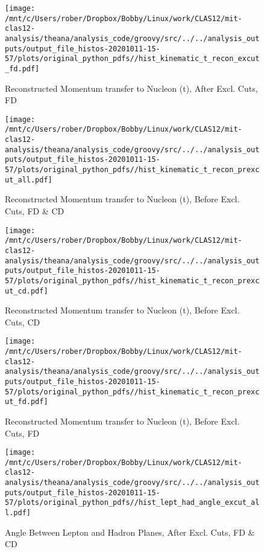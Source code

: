 \documentclass{article}
\begin{document}
\begin{landscape}
\begin{figure}[h]
        \texttt{[image: /mnt/c/Users/rober/Dropbox/Bobby/Linux/work/CLAS12/mit-clas12-analysis/theana/analysis\_code/groovy/src/../../analysis\_outputs/output\_file\_histos-20201011-15-57/plots/original\_python\_pdfs//hist\_kinematic\_t\_recon\_excut\_fd.pdf]}
        \captionsetup{textformat=empty,labelformat=blank}
        \caption{Reconstructed Momentum transfer to Nucleon (t), After Excl. Cuts, FD}
    \end{figure}
    \clearpage
    
    \begin{figure}[h]
        \centering

        \texttt{[image: /mnt/c/Users/rober/Dropbox/Bobby/Linux/work/CLAS12/mit-clas12-analysis/theana/analysis\_code/groovy/src/../../analysis\_outputs/output\_file\_histos-20201011-15-57/plots/original\_python\_pdfs//hist\_kinematic\_t\_recon\_prexcut\_all.pdf]}
        \captionsetup{textformat=empty,labelformat=blank}
        \caption{Reconstructed Momentum transfer to Nucleon (t), Before Excl. Cuts, FD \& CD}
    \end{figure}
    \clearpage
    
    \begin{figure}[h]
        \centering

        \texttt{[image: /mnt/c/Users/rober/Dropbox/Bobby/Linux/work/CLAS12/mit-clas12-analysis/theana/analysis\_code/groovy/src/../../analysis\_outputs/output\_file\_histos-20201011-15-57/plots/original\_python\_pdfs//hist\_kinematic\_t\_recon\_prexcut\_cd.pdf]}
        \captionsetup{textformat=empty,labelformat=blank}
        \caption{Reconstructed Momentum transfer to Nucleon (t), Before Excl. Cuts, CD}
    \end{figure}
    \clearpage
    
    \begin{figure}[h]
        \centering

        \texttt{[image: /mnt/c/Users/rober/Dropbox/Bobby/Linux/work/CLAS12/mit-clas12-analysis/theana/analysis\_code/groovy/src/../../analysis\_outputs/output\_file\_histos-20201011-15-57/plots/original\_python\_pdfs//hist\_kinematic\_t\_recon\_prexcut\_fd.pdf]}
        \captionsetup{textformat=empty,labelformat=blank}
        \caption{Reconstructed Momentum transfer to Nucleon (t), Before Excl. Cuts, FD}
    \end{figure}
    \clearpage
    
    \begin{figure}[h]
        \centering

        \texttt{[image: /mnt/c/Users/rober/Dropbox/Bobby/Linux/work/CLAS12/mit-clas12-analysis/theana/analysis\_code/groovy/src/../../analysis\_outputs/output\_file\_histos-20201011-15-57/plots/original\_python\_pdfs//hist\_lept\_had\_angle\_excut\_all.pdf]}
        \captionsetup{textformat=empty,labelformat=blank}
        \caption{Angle Between Lepton and Hadron Planes, After Excl. Cuts, FD \& CD}
    \end{figure}
    \clearpage
    

\end{landscape}
\end{document}
